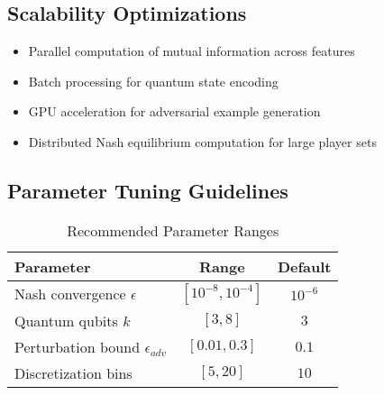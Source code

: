 \documentclass[journal]{IEEEtran}
\begin{document}
\subsection{Scalability Optimizations}

\begin{itemize}
\item Parallel computation of mutual information across features
\item Batch processing for quantum state encoding
\item GPU acceleration for adversarial example generation
\item Distributed Nash equilibrium computation for large player sets
\end{itemize}

\subsection{Parameter Tuning Guidelines}

\begin{table}[htbp]
\centering
\caption{Recommended Parameter Ranges}
\begin{tabular}{lcc}
\toprule
\textbf{Parameter} & \textbf{Range} & \textbf{Default} \\
\midrule
Nash convergence $\epsilon$ & $[10^{-8}, 10^{-4}]$ & $10^{-6}$ \\
Quantum qubits $k$ & $[3, 8]$ & $3$ \\
Perturbation bound $\epsilon_{adv}$ & $[0.01, 0.3]$ & $0.1$ \\
Discretization bins & $[5, 20]$ & $10$ \\
\bottomrule
\end{tabular}
\end{table}



\end{document}
